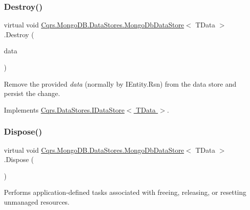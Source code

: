 \subsubsection{\texorpdfstring{Destroy()}{Destroy()}}
{\footnotesize\ttfamily virtual void \hyperlink{classCqrs_1_1MongoDB_1_1DataStores_1_1MongoDbDataStore}{Cqrs.\+Mongo\+D\+B.\+Data\+Stores.\+Mongo\+Db\+Data\+Store}$<$ T\+Data $>$.Destroy (\begin{DoxyParamCaption}\item[{T\+Data}]{data }\end{DoxyParamCaption})\hspace{0.3cm}{\ttfamily [virtual]}}



Remove the provided {\itshape data}  (normally by I\+Entity.\+Rsn) from the data store and persist the change. 



Implements \hyperlink{interfaceCqrs_1_1DataStores_1_1IDataStore_aa7ade96f2f3151d5353cf7bdbb2baec5_aa7ade96f2f3151d5353cf7bdbb2baec5}{Cqrs.\+Data\+Stores.\+I\+Data\+Store$<$ T\+Data $>$}.

\mbox{\label{classCqrs_1_1MongoDB_1_1DataStores_1_1MongoDbDataStore_a5003aba35b02f686cbacf5832a14cf46_a5003aba35b02f686cbacf5832a14cf46}} 
\subsubsection{\texorpdfstring{Dispose()}{Dispose()}}
{\footnotesize\ttfamily virtual void \hyperlink{classCqrs_1_1MongoDB_1_1DataStores_1_1MongoDbDataStore}{Cqrs.\+Mongo\+D\+B.\+Data\+Stores.\+Mongo\+Db\+Data\+Store}$<$ T\+Data $>$.Dispose (\begin{DoxyParamCaption}{ }\end{DoxyParamCaption})\hspace{0.3cm}{\ttfamily [virtual]}}



Performs application-\/defined tasks associated with freeing, releasing, or resetting unmanaged resources. 

